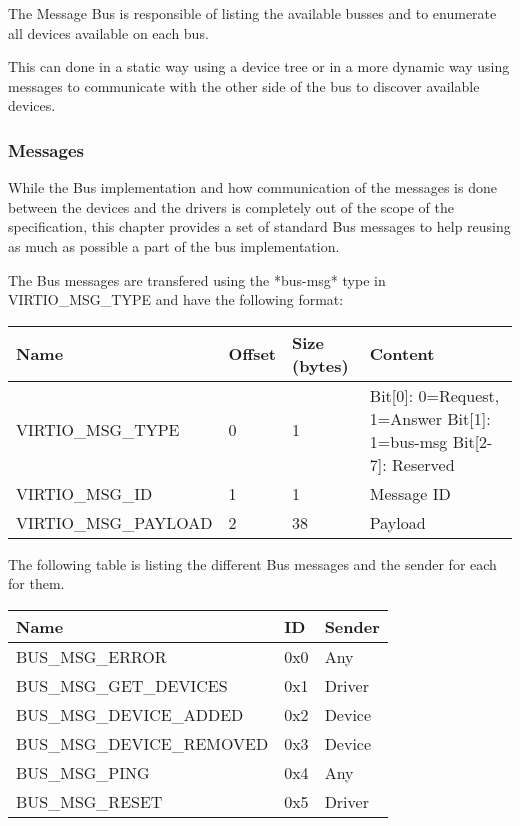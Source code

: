 The Message Bus is responsible of listing the available busses and to enumerate
all devices available on each bus.

This can done in a static way using a device tree or in a more dynamic way using
messages to communicate with the other side of the bus to discover available
devices.

\subsubsection{Messages}\label{sec:Virtio Transport Options / Virtio Over Messages / Message Bus / Messages}

While the Bus implementation and how communication of the messages is done
between the devices and the drivers is completely out of the scope of the
specification, this chapter provides a set of standard Bus messages to help
reusing as much as possible a part of the bus implementation.

The Bus messages are transfered using the *bus-msg* type in VIRTIO_MSG_TYPE and
have the following format:

\begin{tabularx}{\textwidth}{|l|l|l|X|}
\hline
Name & Offset & Size (bytes) & Content \\
\hline \hline
VIRTIO_MSG_TYPE & 0 & 1 & Bit[0]: 0=Request, 1=Answer \newline Bit[1]: 1=bus-msg \newline Bit[2-7]: Reserved \\
\hline
VIRTIO_MSG_ID & 1 & 1 & Message ID \\
\hline
VIRTIO_MSG_PAYLOAD & 2 & 38 & Payload \\
\hline
\end{tabularx}

The following table is listing the different Bus messages and the sender for
each for them.

\begin{tabular}{|l|l|l|}
\hline
Name & ID & Sender \\
\hline
\hline
BUS_MSG_ERROR               & 0x0  & Any    \\
\hline
BUS_MSG_GET_DEVICES         & 0x1  & Driver \\
\hline
BUS_MSG_DEVICE_ADDED        & 0x2  & Device \\
\hline
BUS_MSG_DEVICE_REMOVED      & 0x3  & Device \\
\hline
BUS_MSG_PING                & 0x4  & Any    \\
\hline
BUS_MSG_RESET               & 0x5  & Driver  \\
\hline
\end{tabular}

